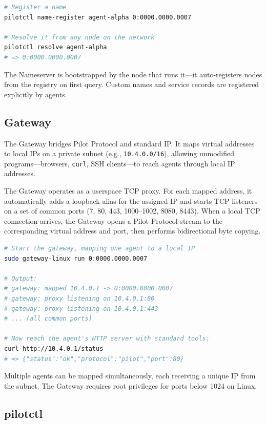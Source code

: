 \documentclass[11pt,a4paper]{article}
\begin{document}
\begin{lstlisting}[language=bash]
# Register a name
pilotctl name-register agent-alpha 0:0000.0000.0007

# Resolve it from any node on the network
pilotctl resolve agent-alpha
# => 0:0000.0000.0007
\end{lstlisting}

The Nameserver is bootstrapped by the node that runs it---it auto-registers nodes from the registry on first query. Custom names and service records are registered explicitly by agents.

\subsection{Gateway}

The Gateway bridges Pilot Protocol and standard IP. It maps virtual addresses to local IPs on a private subnet (e.g., \texttt{10.4.0.0/16}), allowing unmodified programs---browsers, \texttt{curl}, SSH clients---to reach agents through local IP addresses.

The Gateway operates as a userspace TCP proxy. For each mapped address, it automatically adds a loopback alias for the assigned IP and starts TCP listeners on a set of common ports (7, 80, 443, 1000--1002, 8080, 8443). When a local TCP connection arrives, the Gateway opens a Pilot Protocol stream to the corresponding virtual address and port, then performs bidirectional byte copying.

\begin{lstlisting}[language=bash]
# Start the gateway, mapping one agent to a local IP
sudo gateway-linux run 0:0000.0000.0007

# Output:
# gateway: mapped 10.4.0.1 -> 0:0000.0000.0007
# gateway: proxy listening on 10.4.0.1:80
# gateway: proxy listening on 10.4.0.1:443
# ... (all common ports)

# Now reach the agent's HTTP server with standard tools:
curl http://10.4.0.1/status
# => {"status":"ok","protocol":"pilot","port":80}
\end{lstlisting}

Multiple agents can be mapped simultaneously, each receiving a unique IP from the subnet. The Gateway requires root privileges for ports below 1024 on Linux.

\subsection{pilotctl}
\end{document}
